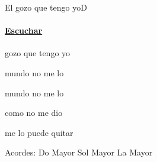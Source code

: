 \documentclass[12pt, spanish]{book}
\begin{document}
    \begin{song}{El gozo que tengo yo}{D}
        {} %
        {}
        {} %
        {}
        \ifChordBk
        \paragraph{\mbox{}\hfill\protect\href{https://open.spotify.com/intl-es/track/7qCtNg0ATftcjQ7HZKlq25}{Escuchar}\mbox{}\hfill}
        \fi
%
        \begin{SBOpGroup}
             gozo que tengo yo

             mundo no me lo 

             mundo no me lo 
        \end{SBOpGroup}

        \begin{SBChorus}
             como no me dio

             me lo puede quitar
        \end{SBChorus}

        \ifChordBk
        \begin{SBOpGroup}
            Acordes:
            \upchord{\C}\qquad Do Mayor \hfill
            \upchord{\G}\qquad Sol Mayor \hfill\null\break
            \upchord{\A}\qquad La Mayor \hfill\null\break
        \end{SBOpGroup}
        \fi
    \end{song}
\end{document}
